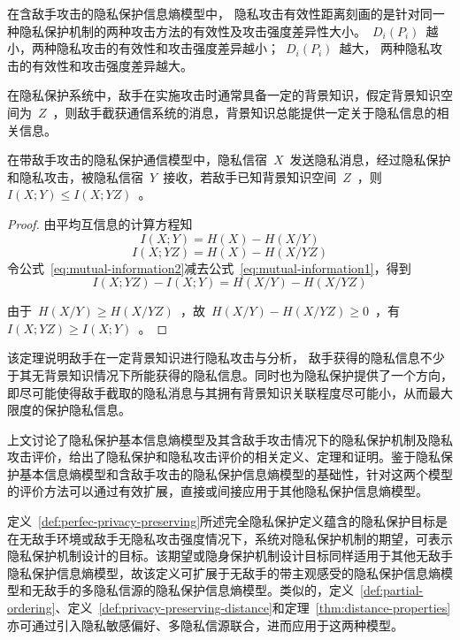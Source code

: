 在含敌手攻击的隐私保护信息熵模型中， 隐私攻击有效性距离刻画的是针对同一种隐私保护机制的两种攻击方法的有效性及攻击强度差异性大小。~$D_{i}(P_{i})$~越小，两种隐私攻击的有效性和攻击强度差异越小；~$D_{i}(P_{i})$~越大， 两种隐私攻击的有效性和攻击强度差异越大。

在隐私保护系统中，敌手在实施攻击时通常具备一定的背景知识，假定背景知识空间为~$Z$~，则敌手截获通信系统的消息，背景知识总能提供一定关于隐私信息的相关信息。

\begin{theorem}
	\label{thm:privacy-attack-performance}
	在带敌手攻击的隐私保护通信模型中，隐私信宿~$X$~发送隐私消息，经过隐私保护和隐私攻击，被隐私信宿~$Y$~接收，若敌手已知背景知识空间~$Z$~，则~$I(X;Y)\leqslant I(X;YZ)$~。
\end{theorem} 

\begin{proof}
由平均互信息的计算方程知
\begin{equation}
\label{eq:mutual-information1}
I(X;Y) =H(X)-H(X/Y)
\end{equation}
\begin{equation}
\label{eq:mutual-information2}
I(X;YZ) =H(X)-H(X/YZ)
\end{equation}
令公式~\ref{eq:mutual-information2}减去公式~\ref{eq:mutual-information1}，得到
\begin{equation}
I(X;YZ)-I(X;Y) =H(X/Y)-H(X/YZ)
\end{equation}

由于~$H(X/Y) \geqslant H(X/YZ)$~，故~$H(X/Y)- H(X/YZ)\geqslant0$~，有~$I(X;YZ)\geqslant I(X;Y)$~。
\end{proof}

该定理说明敌手在一定背景知识进行隐私攻击与分析， 敌手获得的隐私信息不少于其无背景知识情况下所能获得的隐私信息。同时也为隐私保护提供了一个方向，即尽可能使得敌手截取的隐私消息与其拥有背景知识关联程度尽可能小，从而最大限度的保护隐私信息。


上文讨论了隐私保护基本信息熵模型及其含敌手攻击情况下的隐私保护机制及隐私攻击评价，给出了隐私保护和隐私攻击评价的相关定义、定理和证明。鉴于隐私保护基本信息熵模型和含敌手攻击的隐私保护信息熵模型的基础性，针对这两个模型的评价方法可以通过有效扩展，直接或间接应用于其他隐私保护信息熵模型。

定义~\ref{def:perfec-privacy-preserving}所述完全隐私保护定义蕴含的隐私保护目标是在无敌手环境或敌手无隐私攻击强度情况下，系统对隐私保护机制的期望，可表示隐私保护机制设计的目标。该期望或隐身保护机制设计目标同样适用于其他无敌手隐私保护信息熵模型，故该定义可扩展于无敌手的带主观感受的隐私保护信息熵模型和无敌手的多隐私信源的隐私保护信息熵模型。类似的，定义~\ref{def:partial-ordering}、定义~\ref{def:privacy-preserving-distance}和定理~\ref{thm:distance-properties}亦可通过引入隐私敏感偏好、多隐私信源联合，进而应用于这两种模型。

